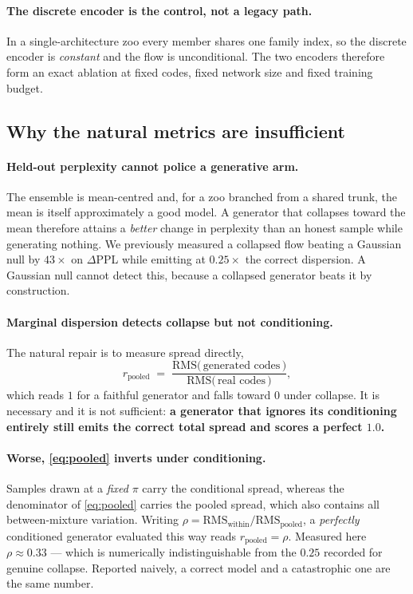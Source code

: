\paragraph{The discrete encoder is the control, not a legacy path.}
In a single-architecture zoo every member shares one family index, so the discrete
encoder is \emph{constant} and the flow is unconditional. The two encoders therefore
form an exact ablation at fixed codes, fixed network size and fixed training budget.

\subsection{Why the natural metrics are insufficient}
\label{app:why}

\paragraph{Held-out perplexity cannot police a generative arm.}
The ensemble is mean-centred and, for a zoo branched from a shared trunk, the mean is
itself approximately a good model. A generator that collapses toward the mean
therefore attains a \emph{better} change in perplexity than an honest sample while
generating nothing. We previously measured a collapsed flow beating a Gaussian null
by $43\times$ on $\Delta$PPL while emitting at $0.25\times$ the correct dispersion. A
Gaussian null cannot detect this, because a collapsed generator beats it by
construction.

\paragraph{Marginal dispersion detects collapse but not conditioning.}
The natural repair is to measure spread directly,
%
\begin{equation}
r_{\mathrm{pooled}} \;=\;
\frac{\mathrm{RMS}\big(\,\text{generated codes}\,\big)}{\mathrm{RMS}\big(\,\text{real codes}\,\big)} ,
\label{eq:pooled}
\end{equation}
%
which reads $1$ for a faithful generator and falls toward $0$ under collapse. It is
necessary and it is not sufficient: \textbf{a generator that ignores its conditioning
entirely still emits the correct total spread and scores a perfect $1.0$.}

\paragraph{Worse, \eqref{eq:pooled} inverts under conditioning.}
Samples drawn at a \emph{fixed} $\pi$ carry the conditional spread, whereas the
denominator of \eqref{eq:pooled} carries the pooled spread, which also contains all
between-mixture variation. Writing $\rho = \mathrm{RMS}_{\text{within}} /
\mathrm{RMS}_{\text{pooled}}$, a \emph{perfectly} conditioned generator evaluated this
way reads $r_{\mathrm{pooled}} = \rho$. Measured here $\rho \approx 0.33$ --- which is
numerically indistinguishable from the $0.25$ recorded for genuine collapse. Reported
naively, a correct model and a catastrophic one are the same number.

